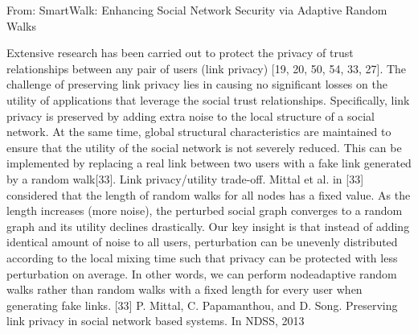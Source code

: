 From: SmartWalk: Enhancing Social Network Security via Adaptive Random Walks

Extensive research has been carried out to protect the privacy of trust relationships between any pair of users (link privacy) [19, 20, 50, 54, 33, 27]. The challenge of preserving link privacy lies in causing no significant losses on the utility of applications that leverage the social trust relationships. Specifically, link privacy is preserved by adding extra noise to the local structure of a social network. At the same time, global structural characteristics are maintained to ensure
that the utility of the social network is not severely reduced. This can be implemented by replacing a real link between two users with a fake link generated by a random walk[33]. Link privacy/utility trade-off. Mittal et al. in [33] considered that the length of random walks for all nodes has a fixed value. As the length increases (more noise), the
perturbed social graph converges to a random graph and its utility declines drastically. Our key insight is that instead of adding identical amount of noise to all users, perturbation can be unevenly distributed according to the local mixing time such that privacy can be protected with less perturbation on average. In other words, we can perform nodeadaptive random walks rather than random walks with a fixed length for every user when generating fake links.
[33] P. Mittal, C. Papamanthou, and D. Song. Preserving link privacy in social network based systems. In NDSS, 2013




